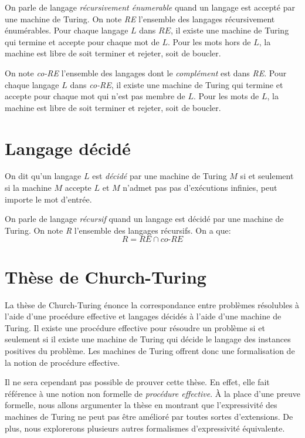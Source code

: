 On parle de langage \og \textit{récursivement énumerable} \fg{} quand un langage est accepté par une machine de Turing.
On note \textit{RE} l'ensemble des langages récursivement énumérables.
Pour chaque langage $L$ dans $RE$, il existe une machine de Turing qui termine et accepte pour chaque mot de $L$.
Pour les mots hors de $L$, la machine est libre de soit terminer et rejeter, soit de boucler.

On note \textit{co-RE} l'ensemble des langages dont le \textit{complément} est dans \textit{RE}.
Pour chaque langage $L$ dans \textit{co-RE}, il existe une machine de Turing qui termine et accepte pour chaque mot qui n'est pas membre de $L$.
Pour les mots de $L$, la machine est libre de soit terminer et rejeter, soit de boucler.

\section{Langage décidé}

On dit qu'un langage $L$ est \og \textit{décidé} \fg{} par une machine de Turing $M$ si et seulement si la machine $M$ accepte $L$ et $M$ n'admet pas pas d'exécutions infinies, peut importe le mot d'entrée.

On parle de langage \og \textit{récursif} \fg{} quand un langage est décidé par une machine de Turing.
On note \textit{R} l'ensemble des langages récursifs. On a que:
\[
R = RE \cap \textit{co-RE}
\]

\section{Thèse de Church-Turing}

La thèse de Church-Turing énonce la correspondance entre problèmes résolubles à l'aide d'une procédure effective et langages décidés à l'aide d'une machine de Turing. Il existe une procédure effective pour résoudre un problème si et seulement si il existe une machine de Turing qui décide le langage des instances positives du problème. Les machines de Turing offrent donc une formalisation de la notion de procédure effective.

Il ne sera cependant pas possible de prouver cette thèse.
En effet, elle fait référence à une notion non formelle de \textit{procédure effective}.
À la place d'une preuve formelle, nous allons argumenter la thèse en montrant que l'expressivité des machines de Turing ne peut pas être amélioré par toutes sortes d'extensions.
De plus, nous explorerons plusieurs autres formalismes d'expressivité équivalente.


